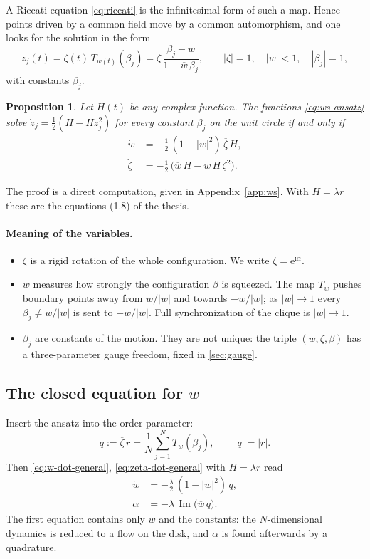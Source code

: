 \documentclass[a4paper,11pt]{article}
\newcommand{\conj}[1]{\overline{#1}}
\newcommand{\T}{T}                       %
\newcommand{\im}{\operatorname{Im}}
\newcommand{\e}{\mathrm{e}}
\newcommand{\ii}{\mathrm{i}}
\newtheorem{proposition}{Proposition}
\theoremstyle{remark}
\begin{document}
A Riccati equation \eqref{eq:riccati} is the infinitesimal form of such a map.
Hence points driven by a common field move by a common automorphism, and one
looks for the solution in the form
\begin{equation}\label{eq:ws-ansatz}
z_j(t)=\zeta(t)\,\T_{w(t)}(\beta_j)=\zeta\,\frac{\beta_j-w}{1-\conj w\,\beta_j},
\qquad |\zeta|=1,\quad |w|<1,\quad |\beta_j|=1,
\end{equation}
with constants $\beta_j$.

\begin{proposition}\label{prop:ws}
Let $H(t)$ be any complex function. The functions \eqref{eq:ws-ansatz} solve
$\dot z_j=\tfrac12(H-\conj H z_j^2)$ for every constant $\beta_j$ on the unit
circle if and only if
\begin{align}
\dot w&=-\tfrac12\,(1-|w|^2)\,\conj\zeta\,H,\label{eq:w-dot-general}\\
\dot\zeta&=-\tfrac12\,\bigl(\conj w\,H-w\,\conj H\,\zeta^2\bigr).\label{eq:zeta-dot-general}
\end{align}
\end{proposition}
The proof is a direct computation, given in Appendix~\ref{app:ws}. With $H=\lambda r$
these are the equations (1.8) of the thesis.

\paragraph{Meaning of the variables.}
\begin{itemize}[nosep]
\item $\zeta$ is a rigid rotation of the whole configuration. We write
      $\zeta=\e^{\ii\alpha}$.
\item $w$ measures how strongly the configuration $\beta$ is squeezed. The map
      $\T_w$ pushes boundary points away from $w/|w|$ and towards $-w/|w|$; as
      $|w|\to1$ every $\beta_j\neq w/|w|$ is sent to $-w/|w|$. Full
      synchronization of the clique is $|w|\to1$.
\item $\beta_j$ are constants of the motion. They are not unique: the triple
      $(w,\zeta,\beta)$ has a three-parameter gauge freedom, fixed in
      \cref{sec:gauge}.
\end{itemize}

\subsection{The closed equation for $w$}

Insert the ansatz into the order parameter:
\begin{equation}\label{eq:q-complete}
q:=\conj\zeta\,r=\frac1N\sum_{j=1}^{N}\T_w(\beta_j),\qquad |q|=|r| .
\end{equation}
Then \eqref{eq:w-dot-general}, \eqref{eq:zeta-dot-general} with $H=\lambda r$
read
\begin{align}
\dot w&=-\frac\lambda2\,(1-|w|^2)\,q,\label{eq:w-dot}\\
\dot\alpha&=-\lambda\,\im\bigl(\conj w\,q\bigr).\label{eq:alpha-dot}
\end{align}
The first equation contains only $w$ and the constants: the $N$-dimensional
dynamics is reduced to a flow on the disk, and $\alpha$ is found afterwards by
a quadrature.
\end{document}
